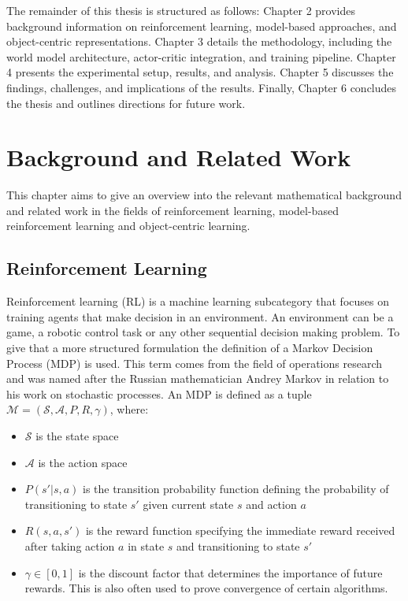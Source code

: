 \documentclass[
	english,
	ruledheaders=section,
	class=report,
	thesis={type=master},
	accentcolor=9c,
	custommargins=true,
	marginpar=false,
	parskip=half-,
	fontsize=11pt,
	pdfa=true,
]{tudapub}
\newcommand{\worldmodel}{world model}
\begin{document}
The remainder of this thesis is structured as follows: Chapter 2 provides
background information on reinforcement learning, model-based approaches, and
object-centric representations. Chapter 3 details the methodology, including
the \worldmodel{} architecture, actor-critic integration, and training
pipeline. Chapter 4 presents the experimental setup, results, and analysis.
Chapter 5 discusses the findings, challenges, and implications of the results.
Finally, Chapter 6 concludes the thesis and outlines directions for future
work.

\chapter{Background and Related Work}
\label{chap:background}
This chapter aims to give an overview into the relevant mathematical background and related work
in the fields of reinforcement learning, model-based reinforcement learning and object-centric learning.
\section{Reinforcement Learning}
\label{sec:reinforcement_learning}

Reinforcement learning (RL) is a machine learning subcategory that focuses on
training agents that make decision in an environment. An environment can be a
game, a robotic control task or any other sequential decision making problem.
To give that a more structured formulation the definition of a Markov Decision
Process (MDP) is used. This term comes from the field of operations research
and was named after the Russian mathematician Andrey Markov in relation to his
work on stochastic processes. An MDP is defined as a tuple $\mathcal{M} =
	(\mathcal{S}, \mathcal{A}, P, R, \gamma)$, where:

\begin{itemize}
	\item $\mathcal{S}$ is the state space
	\item $\mathcal{A}$ is the action space
	\item $P(s'|s,a)$ is the transition probability function defining the probability of transitioning to state $s'$ given current state $s$ and action $a$
	\item $R(s,a,s')$ is the reward function specifying the immediate reward received after taking action $a$ in state $s$ and transitioning to state $s'$
	\item $\gamma \in [0,1]$ is the discount factor that determines the importance of future rewards. This is also often used to prove convergence of certain algorithms.
\end{itemize}
\end{document}
